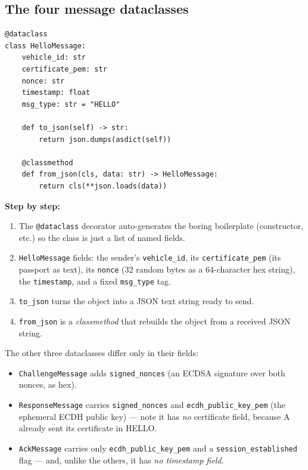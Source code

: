 \documentclass[11pt,a4paper]{report}
\begin{document}
\subsection{The four message dataclasses}
\begin{lstlisting}[style=py,caption={auth\_protocol.py --- the HELLO message (the
other three messages follow the same pattern).}]
@dataclass
class HelloMessage:
    vehicle_id: str
    certificate_pem: str
    nonce: str
    timestamp: float
    msg_type: str = "HELLO"

    def to_json(self) -> str:
        return json.dumps(asdict(self))

    @classmethod
    def from_json(cls, data: str) -> HelloMessage:
        return cls(**json.loads(data))
\end{lstlisting}
\textbf{Step by step:}
\begin{enumerate}
  \item The \texttt{@dataclass} decorator auto-generates the boring boilerplate
        (constructor, etc.) so the class is just a list of named fields.
  \item \texttt{HelloMessage} fields: the sender's \texttt{vehicle\_id}, its
        \texttt{certificate\_pem} (its passport as text), its \texttt{nonce}
        (32 random bytes as a 64-character hex string), the \texttt{timestamp},
        and a fixed \texttt{msg\_type} tag.
  \item \texttt{to\_json} turns the object into a JSON text string ready to send.
  \item \texttt{from\_json} is a \emph{classmethod} that rebuilds the object from
        a received JSON string.
\end{enumerate}
The other three dataclasses differ only in their fields:
\begin{itemize}
  \item \texttt{ChallengeMessage} adds \texttt{signed\_nonces} (an ECDSA
        signature over both nonces, as hex).
  \item \texttt{ResponseMessage} carries \texttt{signed\_nonces} and
        \texttt{ecdh\_public\_key\_pem} (the ephemeral ECDH public key) ---
        note it has \emph{no} certificate field, because A already sent its
        certificate in HELLO.
  \item \texttt{AckMessage} carries only \texttt{ecdh\_public\_key\_pem} and a
        \texttt{session\_established} flag --- and, unlike the others, it has
        \emph{no timestamp field}.
\end{itemize}
\end{document}
